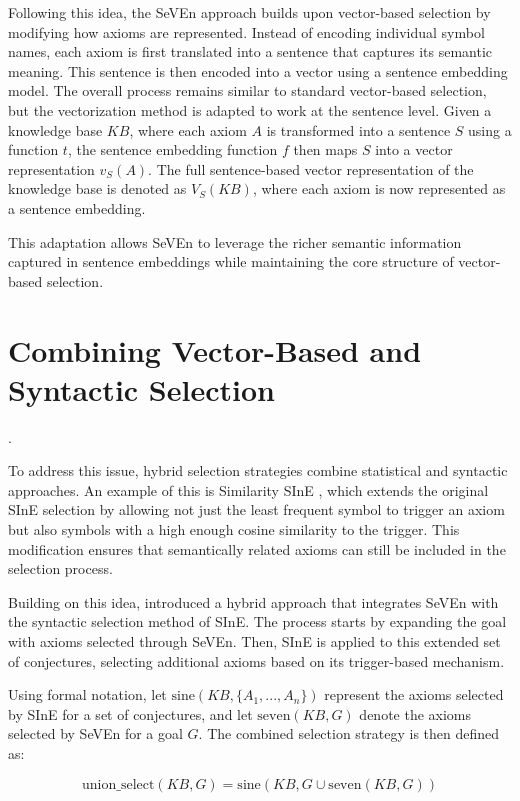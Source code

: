 \documentclass[english,version-2020-11]{uzl-thesis}
\begin{document}
Following this idea, the SeVEn approach builds upon vector-based selection by modifying how axioms are represented. Instead of encoding individual symbol names, each axiom is first translated into a sentence that captures its semantic meaning. This sentence is then encoded into a vector using a sentence embedding model. The overall process remains similar to standard vector-based selection, but the vectorization method is adapted to work at the sentence level. Given a knowledge base \( KB \), where each axiom \( A \) is transformed into a sentence \( S \) using a function \( t \), the sentence embedding function \( f \) then maps \( S \) into a vector representation \( v_S(A) \). The full sentence-based vector representation of the knowledge base is denoted as \( V_S(KB) \), where each axiom is now represented as a sentence embedding.

This adaptation allows SeVEn to leverage the richer semantic information captured in sentence embeddings while maintaining the core structure of vector-based selection.

\section{Combining Vector-Based and Syntactic Selection}.

To address this issue, hybrid selection strategies combine statistical and syntactic approaches. An example of this is Similarity SInE \cite{Furbach2019WordEmbeddings}, which extends the original SInE selection by allowing not just the least frequent symbol to trigger an axiom but also symbols with a high enough cosine similarity to the trigger. This modification ensures that semantically related axioms can still be included in the selection process.

Building on this idea, \cite{Schon2023} introduced a hybrid approach that integrates SeVEn with the syntactic selection method of SInE. The process starts by expanding the goal with axioms selected through SeVEn. Then, SInE is applied to this extended set of conjectures, selecting additional axioms based on its trigger-based mechanism. 

Using formal notation, let \( \text{sine}(KB, \{A_1, ..., A_n\}) \) represent the axioms selected by SInE for a set of conjectures, and let \( \text{seven}(KB, G) \) denote the axioms selected by SeVEn for a goal \( G \). The combined selection strategy is then defined as:

\begin{definition}
    \begin{equation}
        \text{union\_select}(KB, G) = \text{sine}(KB, G \cup \text{seven}(KB, G))
    \end{equation}
\end{definition}
\end{document}
